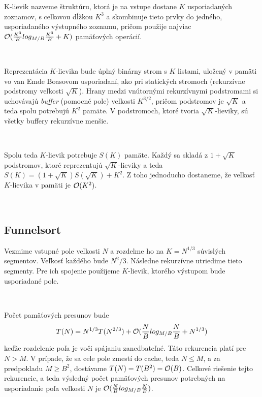 K-lievik nazveme štruktúru, ktorá je na vstupe dostane $K$ usporiadaných zoznamov, s celkovou dĺžkou $K^3$ a skombinuje tieto prvky do jedného, usporiadaného výstupného zoznamu, pričom použije najviac $\mathcal{O}(\frac{K^3}{B} log_{M/B} \frac{K^3}{B} + K)$ pamäťových operácií.

\

Reprezentácia $K$-lievika bude úplný binárny strom s $K$ listami, uložený v pamäti vo van Emde Boasovom usporiadaní, ako pri statických stromoch (rekurzívne podstromy veľkosti $\sqrt{K}$). Hrany medzi vnútornými rekurzívnymi podstromami si uchovávajú {\em buffer} (pomocné pole) veľkosti $K^{3/2}$, pričom podstromov je $\sqrt{K}$ a teda spolu potrebujú $K^2$ pamäte. V podstromoch, ktoré tvoria $\sqrt{K}$-lieviky, sú všetky buffery rekurzívne menšie.

\

Spolu teda $K$-lievik potrebuje $S(K)$ pamäte. Každý sa skladá z $1+\sqrt{K}$ podstromov, ktoré reprezentujú $\sqrt{K}$-lieviky a teda $S(K) = (1+\sqrt{K})S(\sqrt{K}) + K^2$. Z toho jednoducho dostaneme, že veľkosť $K$-lievika v pamäti je $\mathcal{O}(K^2)$.

\


\subsection{Funnelsort}

Vezmime vstupné pole veľkosti $N$ a rozdelme ho na $K = N^{1/3}$ súvislých segmentov. Veľkosť každého bude $N^2/3$. Následne rekurzívne utriedime tieto segmenty. Pre ich spojenie použijeme $K$-lievik, ktorého výstupom bude usporiadané pole.

\

Počet pamäťových presunov bude
\[
T(N) = N^{1/3}T(N^{2/3}) + \mathcal{O}(\frac{N}{B} log_{M/B} \frac{N}{B} + N^{1/3})
\]
keďže rozdelenie poľa je voči spájaniu zanedbateľné. Táto rekurencia platí pre $N > M$. V prípade, že sa cele pole zmestí do cache, teda $N \le M$, a za predpokladu $M \ge B^2$, dostávame $T(N) = T(B^2) = \mathcal{O}(B)$. Celkové riešenie tejto rekurencie, a teda výsledný počet pamäťových presunov potrebných na usporiadanie poľa veľkosti $N$ je $\mathcal{O}(\frac{N}{B} log_{M/B} \frac{N}{B})$.